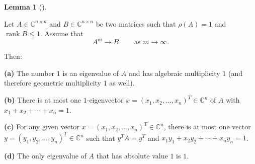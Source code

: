 \documentclass[numbers=enddot,12pt,final,onecolumn,notitlepage]{scrartcl}%
\numberwithin{exer}{subsection}
\theoremstyle{definition}
\newtheorem{lem}[theo]{Lemma}
\newenvironment{lemma}[1][]
{\begin{lem}[#1]\begin{leftbar}}
{\end{leftbar}\end{lem}}
\begin{document}
\begin{lemma}
\label{lem.posmat.uniques}Let $A\in\mathbb{C}^{n\times n}$ and $B\in
\mathbb{C}^{n\times n}$ be two matrices such that $\rho\left(  A\right)  =1$
and $\operatorname*{rank}B\leq1$. Assume that%
\begin{equation}
A^{m}\rightarrow B\ \ \ \ \ \ \ \ \ \ \text{as }m\rightarrow\infty.
\label{eq.lem.posmat.uniques.ass}%
\end{equation}


Then: \medskip

\textbf{(a)} The number $1$ is an eigenvalue of $A$ and has algebraic
multiplicity $1$ (and therefore geometric multiplicity $1$ as well). \medskip

\textbf{(b)} There is at most one $1$-eigenvector $x=\left(  x_{1}%
,x_{2},\ldots,x_{n}\right)  ^{T}\in\mathbb{C}^{n}$ of $A$ with $x_{1}%
+x_{2}+\cdots+x_{n}=1$. \medskip

\textbf{(c)} For any given vector $x=\left(  x_{1},x_{2},\ldots,x_{n}\right)
^{T}\in\mathbb{C}^{n}$, there is at most one vector $y=\left(  y_{1}%
,y_{2},\ldots,y_{n}\right)  ^{T}\in\mathbb{C}^{n}$ such that $y^{T}A=y^{T}$
and $x_{1}y_{1}+x_{2}y_{2}+\cdots+x_{n}y_{n}=1$. \medskip

\textbf{(d)} The only eigenvalue of $A$ that has absolute value $1$ is $1$.
\end{lemma}
\end{document}
